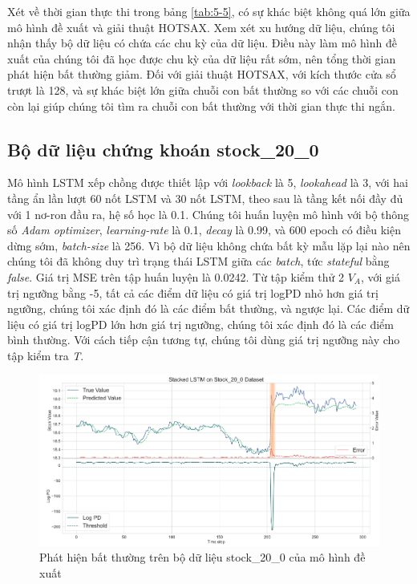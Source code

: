 Xét về thời gian thực thi trong bảng \ref{tab:5-5}, có sự khác biệt không quá lớn giữa mô hình đề xuất và giải thuật HOTSAX. Xem xét xu hướng dữ liệu, chúng tôi nhận thấy bộ dữ liệu có chứa các chu kỳ của dữ liệu. Điều này làm mô hình đề xuất của chúng tôi đã học được chu kỳ của dữ liệu rất sớm, nên tổng thời gian phát hiện bất thường giảm. Đối với giải thuật HOTSAX, với kích thước cửa sổ trượt là 128, và sự khác biệt lớn giữa chuỗi con bất thường so với các chuỗi con còn lại giúp chúng tôi tìm ra chuỗi con bất thường với thời gian thực thi ngắn.

\subsection{Bộ dữ liệu chứng khoán stock\_20\_0}
Mô hình LSTM xếp chồng được thiết lập với \textit{lookback} là 5, \textit{lookahead} là 3, với hai tầng ẩn lần lượt 60 nốt LSTM và 30 nốt LSTM, theo sau là tầng kết nối đầy đủ với 1 nơ-ron đầu ra, hệ số học là 0.1. Chúng tôi huấn luyện mô hình với bộ thông số \textit{Adam optimizer}, \textit{learning-rate} là 0.1, \textit{decay} là 0.99, và 600 epoch có điều kiện dừng sớm, \textit{batch-size} là 256. Vì bộ dữ liệu không chứa bất kỳ mẫu lặp lại nào nên chúng tôi đã không duy trì trạng thái LSTM giữa các \textit{batch}, tức \textit{stateful} bằng \textit{false}. Giá trị MSE trên tập huấn luyện là 0.0242. Từ tập kiểm thử 2 $V_{A}$, với giá trị ngưỡng bằng -5, tất cả các điểm dữ liệu có giá trị logPD nhỏ hơn giá trị ngưỡng, chúng tôi xác định đó là các điểm bất thường, và ngược lại. Các điểm dữ liệu có giá trị logPD lớn hơn giá trị ngưỡng, chúng tôi xác định đó là các điểm bình thường. Với cách tiếp cận tương tự, chúng tôi dùng giá trị ngưỡng này cho tập kiểm tra \textit{T}.

\begin{figure}[H]
    \centering
    \includegraphics[scale=1]{./content/images/5-11.png}
    \caption{Phát hiện bất thường trên bộ dữ liệu stock\_20\_0 của mô hình đề xuất}
    \label{fig:5-11}
\end{figure}

